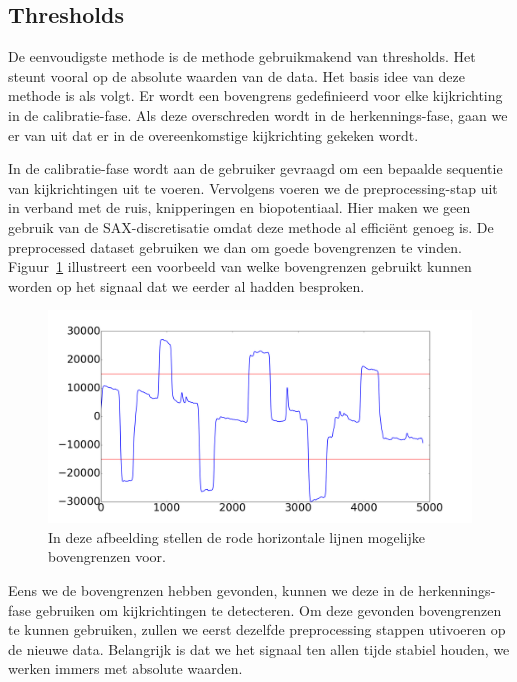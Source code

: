 \documentclass{article}
\begin{document}
\subsection{Thresholds}

De eenvoudigste methode is de methode gebruikmakend van thresholds. Het steunt vooral op de absolute waarden van de data. Het basis idee van deze methode is als volgt. Er wordt een bovengrens gedefinieerd voor elke kijkrichting in de calibratie-fase. Als deze overschreden wordt in de herkennings-fase, gaan we er van uit dat er in de overeenkomstige kijkrichting gekeken wordt.

In de calibratie-fase wordt aan de gebruiker gevraagd om een bepaalde sequentie van kijkrichtingen uit te voeren. Vervolgens voeren we de preprocessing-stap uit in verband met de ruis, knipperingen en biopotentiaal. Hier maken we geen gebruik van de SAX-discretisatie omdat deze methode al efficiënt genoeg is. De preprocessed dataset gebruiken we dan om goede bovengrenzen te vinden. Figuur~\ref{fig:thresholds} illustreert een voorbeeld van welke bovengrenzen gebruikt kunnen worden op het signaal dat we eerder al hadden besproken.

\begin{figure}[h]
\centering
\includegraphics[width=\linewidth]{images/thresholds_voorbeeld}
\caption{In deze afbeelding stellen de rode horizontale lijnen mogelijke bovengrenzen voor.}
 \label{fig:thresholds}
\end{figure}

Eens we de bovengrenzen hebben gevonden, kunnen we deze in de herkennings-fase gebruiken om kijkrichtingen te detecteren. Om deze gevonden bovengrenzen te kunnen gebruiken, zullen we eerst dezelfde preprocessing stappen utivoeren op de nieuwe data. Belangrijk is dat we het signaal ten allen tijde stabiel houden, we werken immers met absolute waarden.
\end{document}
